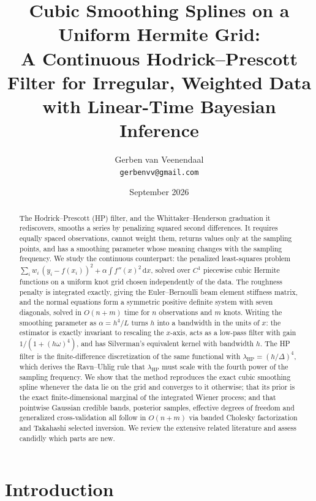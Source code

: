 \documentclass[11pt,a4paper]{article}
\title{Cubic Smoothing Splines on a Uniform Hermite Grid:\\
A Continuous Hodrick--Prescott Filter for Irregular, Weighted Data\\
with Linear-Time Bayesian Inference}
\author{Gerben van Veenendaal\\\texttt{gerbenvv@gmail.com}}
\date{September 2026}
\theoremstyle{definition}
\theoremstyle{remark}
\newcommand{\dd}{\,\mathrm{d}}
\begin{document}
\maketitle

\begin{abstract}
The Hodrick--Prescott (HP) filter, and the Whittaker--Henderson graduation it rediscovers, smooths a series by penalizing squared second differences. It requires equally spaced observations, cannot weight them, returns values only at the sampling points, and has a smoothing parameter whose meaning changes with the sampling frequency. We study the continuous counterpart: the penalized least-squares problem $\sum_i w_i\,(y_i-f(x_i))^2+\alpha\int f''(x)^2\dd x$, solved over $C^1$ piecewise cubic Hermite functions on a uniform knot grid chosen independently of the data. The roughness penalty is integrated exactly, giving the Euler--Bernoulli beam element stiffness matrix, and the normal equations form a symmetric positive definite system with seven diagonals, solved in $O(n+m)$ time for $n$ observations and $m$ knots. Writing the smoothing parameter as $\alpha=h^4/L$ turns $h$ into a bandwidth in the units of $x$: the estimator is exactly invariant to rescaling the $x$-axis, acts as a low-pass filter with gain $1/(1+(h\omega)^4)$, and has Silverman's equivalent kernel with bandwidth $h$. The HP filter is the finite-difference discretization of the same functional with $\lambda_{\mathrm{HP}}=(h/\Delta)^4$, which derives the Ravn--Uhlig rule that $\lambda_{\mathrm{HP}}$ must scale with the fourth power of the sampling frequency. We show that the method reproduces the exact cubic smoothing spline whenever the data lie on the grid and converges to it otherwise; that its prior is the exact finite-dimensional marginal of the integrated Wiener process; and that pointwise Gaussian credible bands, posterior samples, effective degrees of freedom and generalized cross-validation all follow in $O(n+m)$ via banded Cholesky factorization and Takahashi selected inversion. We review the extensive related literature and assess candidly which parts are new.
\end{abstract}

\tableofcontents

\section{Introduction}
\label{sec:introduction}
\end{document}
